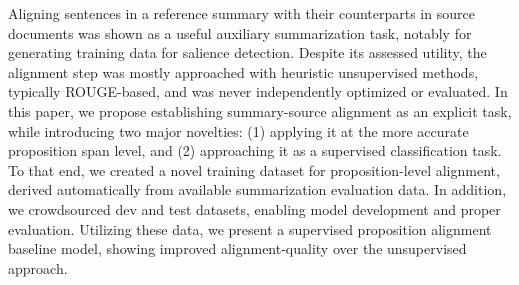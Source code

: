 Aligning sentences in a reference summary with their counterparts in source documents was shown as a useful auxiliary summarization task, notably for generating training data for salience detection. Despite its assessed utility, the alignment step was mostly approached with heuristic unsupervised methods, typically ROUGE-based, and was never independently optimized or evaluated. In this paper, we propose establishing summary-source alignment as an explicit task, while introducing two major novelties: (1) applying it at the more accurate proposition span level, and (2) approaching it as a supervised classification task. To that end, we created a novel training dataset for proposition-level alignment, derived automatically from available summarization evaluation data. In addition, we crowdsourced dev and test datasets, enabling model development and proper evaluation. Utilizing these data, we present a supervised proposition alignment baseline model, showing improved alignment-quality over the unsupervised approach.
